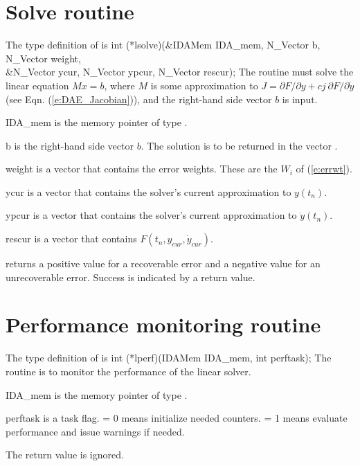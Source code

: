 \section{Solve routine}
The type definition of  is
{
  int (*lsolve)(&IDAMem IDA\_mem, N\_Vector b, N\_Vector weight, \\
                &N\_Vector ycur, N\_Vector ypcur, N\_Vector rescur);  
}
{
  The routine  must solve the linear equation $M x = b$, where         
  $M$ is some approximation to
  $J = \partial F / \partial y + cj ~ \partial F / \partial \dot{y}$  
  (see Eqn. (\ref{e:DAE_Jacobian})), and the right-hand side vector $b$ is input. 
}
{
  \begin{args}
  \item[IDA\_mem]
    is the {\idas} memory pointer of type .
  \item[b]
    is the right-hand side vector $b$. The solution is to be    
    returned in the vector .
  \item[weight]
    is a vector that contains the error weights.
    These are the $W_i$ of (\ref{e:errwt}).
  \item[ycur]
    is a vector that contains the solver's current approximation to $y(t_n)$.
  \item[ypcur]
    is a vector that contains the solver's current approximation to $\dot{y}(t_n)$.
  \item[rescur]
    is a vector that contains $F(t_n,y_{cur},\dot{y}_{cur})$. 
  \end{args}
}
{
   returns a positive value    
  for a recoverable error and a negative value for an             
  unrecoverable error. Success is indicated by a  return value.
}
{}


\section{Performance monitoring routine}
The type definition of  is
{
  int (*lperf)(IDAMem IDA\_mem, int perftask);
}
{
  The routine  is to monitor the performance of the linear solver.
}
{
  \begin{args}
  \item[IDA\_mem]
    is the {\idas} memory pointer of type .
  \item[perftask]
    is a task flag.   = 0 means initialize needed counters.
     = 1 means evaluate performance and issue warnings if needed.
  \end{args}
}
{
  The  return value is ignored.
}
{}

